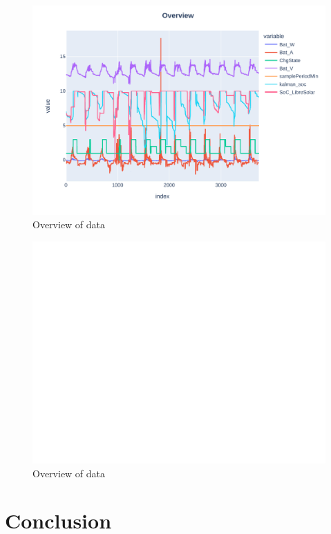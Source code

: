 \begin{figure}[!ht]
\includegraphics{overview}
\caption{\label{fig:overview} Overview of data}
\end{figure}

\begin{figure}[!ht]
\includegraphics{matplotoverview}
\caption{\label{fig:overview} Overview of data}
\end{figure}

\chapter{Conclusion}

